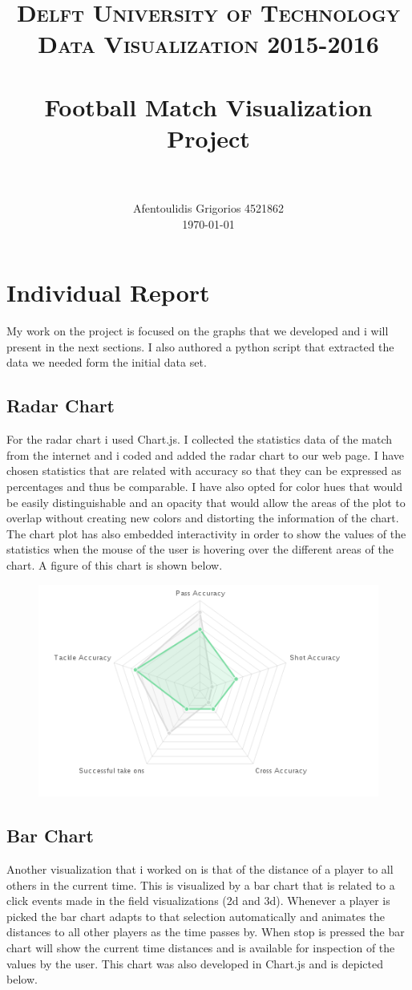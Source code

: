 \documentclass{article}
\title{ 	
		\usefont{OT1}{bch}{b}{n}
		\normalfont \normalsize \textsc{Delft University of Technology \protect\\ Data Visualization 2015-2016} \\ [25pt]
		\horrule{0.5pt} \\[0.4cm]
		\huge Football Match Visualization Project \\
		\horrule{2pt} \\[0.5cm]
}
\author{
		\normalfont 								\normalsize
        Afentoulidis Grigorios 4521862\\[-3pt]		\normalsize
        \today
}
\date{}
\begin{document}
\lstset{language=Prolog}
\maketitle

\section{Individual Report}
My work on the project is focused on the graphs that we developed and i will present in the next sections. I also authored a python script that extracted the data we needed form the initial data set.


\subsection{Radar Chart}
For the radar chart i used Chart.js. I collected the statistics data of the match from the internet and i coded and added the radar chart to our web page. I have chosen statistics that are related with accuracy so that they can be expressed as percentages and thus be comparable. I have also opted for color hues that would be easily distinguishable and an opacity that would allow the areas of the plot to overlap without creating new colors and distorting the information of the chart. The chart plot has also embedded interactivity in order to show the values of the statistics when the mouse of the user is hovering over the different areas of the chart. A figure of this chart is shown below.

\begin{figure}[ht!]
\centering
\includegraphics[scale=0.35]{radar}
\end{figure}

\subsection{Bar Chart}
Another visualization that i worked on is that of the distance of a player to all others in the current time. This is visualized by a bar chart that is related to a click events made in the field visualizations (2d and 3d). Whenever a player is picked the bar chart adapts to that selection automatically and animates the distances to all other players as the time passes by. When stop is pressed the bar chart will show the current time distances and is available for inspection of the values by the user. This chart was also developed in Chart.js and is depicted below.
\end{document}
